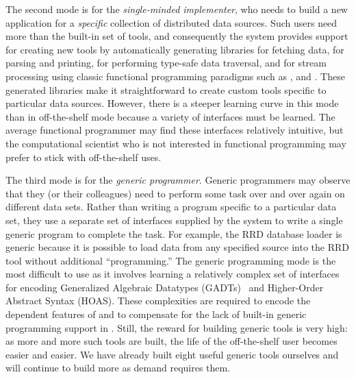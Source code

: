 The second mode is
for the {\em single-minded implementer}, who needs to build a new
application for a {\em specific} collection of distributed data
sources.  Such users need more than the built-in set of tools, 
and consequently the system provides support for
creating new tools by automatically generating libraries for fetching
data, for parsing and printing, for performing type-safe data
traversal, and for stream processing using classic functional
programming paradigms such as ,  and .
These generated libraries make it straightforward to create custom tools
specific to particular data sources.  However, there is a steeper learning
curve in this mode than in off-the-shelf mode because a variety of
interfaces must be learned.  The average functional programmer may find
these interfaces relatively intuitive, but the computational scientist
who is not interested in functional programming may prefer to stick with
off-the-shelf uses. 

The third mode is for the {\em generic programmer}.  Generic
programmers may observe that they (or their colleagues) 
need to perform some task over and over again on different
data sets.  Rather than writing a program specific to a particular
data set, they use a 
separate set of interfaces supplied by the \padsd{} system to write a
single generic program to complete the task.  For example, the RRD database
loader is generic because it is possible to load data from any
specified source into the RRD tool without additional ``programming.''
The generic programming mode is the most difficult to use as it involves
learning a relatively complex set of interfaces for encoding
Generalized Algebraic Datatypes (GADTs)~\cite{xi:popl03} 
and Higher-Order Abstract Syntax (HOAS). 
These complexities are required to encode 
the dependent features of \padsd{} and to compensate for the lack of
built-in generic programming support in \ocaml{}. 
Still, the reward for building generic tools is very high:
as more and more such tools are built, the life of the off-the-shelf
user becomes easier and easier.  We have already built eight useful
generic tools ourselves and will continue to build more as demand requires
them.



